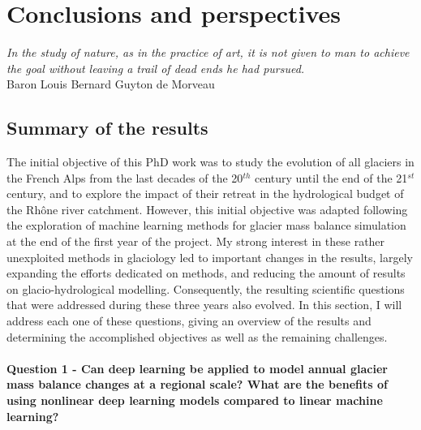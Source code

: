 \chapter{Conclusions and perspectives}
\label{chap:discussion}

\begin{flushright}
\begin{small}
\textit{In the study of nature, as in the practice of art, it is not given to man to achieve the goal without leaving a trail of dead ends he had pursued.}\\ 
Baron Louis Bernard Guyton de Morveau
\end{small}
\end{flushright}

\section{Summary of the results}

The initial objective of this PhD work was to study the evolution of all glaciers in the French Alps from the last decades of the 20$^{th}$ century until the end of the 21$^{st}$ century, and to explore the impact of their retreat in the hydrological budget of the Rhône river catchment. However, this initial objective was adapted following the exploration of machine learning methods for glacier mass balance simulation at the end of the first year of the project. My strong interest in these rather unexploited methods in glaciology led to important changes in the results, largely expanding the efforts dedicated on methods, and reducing the amount of results on glacio-hydrological modelling. Consequently, the resulting scientific questions that were addressed during these three years also evolved. In this section, I will address each one of these questions, giving an overview of the results and determining the accomplished objectives as well as the remaining challenges.

\subsubsection{Question 1 - Can deep learning be applied to model annual glacier mass balance changes at a regional scale? What are the benefits of using nonlinear deep learning models compared to linear machine learning?}

